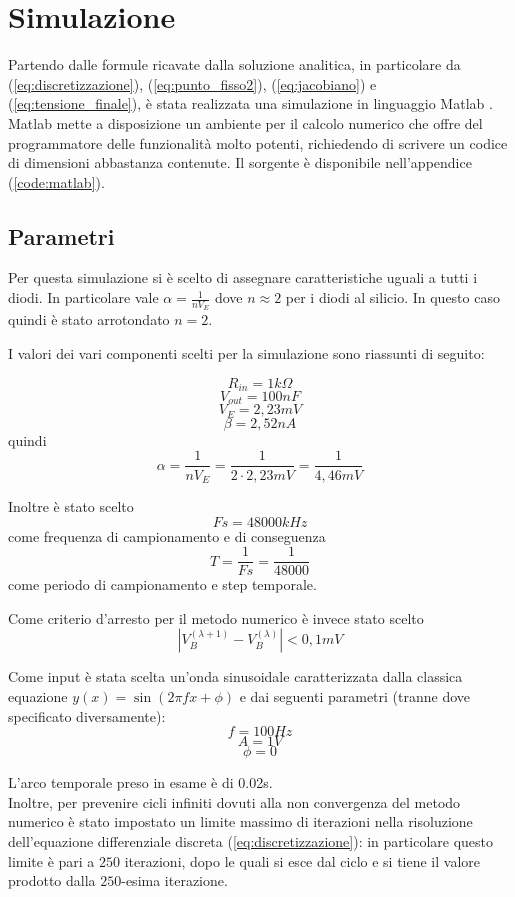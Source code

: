 \chapter{Simulazione}
	Partendo dalle formule ricavate dalla soluzione analitica, in particolare da (\ref{eq:discretizzazione}), (\ref{eq:punto_fisso2}), (\ref{eq:jacobiano}) e (\ref{eq:tensione_finale}), è stata realizzata una simulazione in linguaggio Matlab \cite{matlab, matlab_book}. Matlab mette a disposizione un ambiente per il calcolo numerico che offre del programmatore delle funzionalità molto potenti, richiedendo di scrivere un codice di dimensioni abbastanza contenute. Il sorgente è disponibile nell'appendice (\ref{code:matlab}).
	
	\section{Parametri}
		Per questa simulazione si è scelto di assegnare caratteristiche uguali a tutti i diodi. In particolare vale $\alpha = \frac{1}{nV_{E}}$ dove $n \approx 2$ per i diodi al silicio. In questo caso quindi è stato arrotondato $n = 2$.
	
		I valori dei vari componenti scelti per la simulazione sono riassunti di seguito:
	
		\[
			R_{in} = 1k\Omega
		\]
		\[
			V_{out} = 100nF
		\]
		\[
			V_{E} = 2,23mV
		\]
		\[
			\beta = 2,52nA
		\]
		quindi
		\[
			\alpha = \frac{1}{nV_{E}} = \frac{1}{2 \cdot 2,23mV} = \frac{1}{4,46mV}
		\]
	
		Inoltre è stato scelto
		\[
			Fs = 48000kHz
		\]
		come frequenza di campionamento e di conseguenza
		\[
			T = \frac{1}{Fs} = \frac{1}{48000}
		\]
		come periodo di campionamento e step temporale.
		
		Come criterio d'arresto per il metodo numerico è invece stato scelto
		\[
			|V_{B}^{(\lambda+1)} - V_{B}^{(\lambda)}| < 0,1mV
		\]
	
		Come input è stata scelta un'onda sinusoidale caratterizzata dalla classica equazione $y(x) = \sin (2 \pi f x + \phi)$ e dai seguenti parametri (tranne dove specificato diversamente):
		\[
			f = 100Hz
		\]
		\[
			A = 1V
		\]
		\[
			\phi = 0
		\]
		
		\vspace{10px}
		L'arco temporale preso in esame è di 0.02s.\\
		
		Inoltre, per prevenire cicli infiniti dovuti alla non convergenza del metodo numerico è stato impostato un limite massimo di iterazioni nella risoluzione dell'equazione differenziale discreta (\ref{eq:discretizzazione}): in particolare questo limite è pari a $250$ iterazioni, dopo le quali si esce dal ciclo e si tiene il valore prodotto dalla $250$-esima iterazione.
	\pagebreak
	

